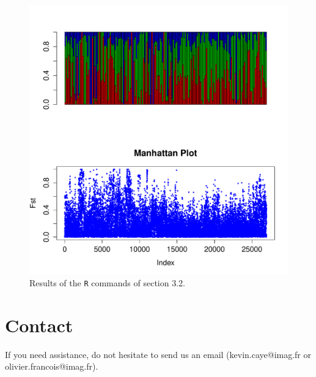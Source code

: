 \documentclass[10pt,a4paper]{article}
\begin{document}
\begin{figure}[h!]\centering
\includegraphics[width=\linewidth]{barplot.pdf}
\caption{Results of the {\tt R} commands of section 3.2.}\label{fig:bar}
\end{figure} 

\section{Contact}
If you need assistance, do not hesitate to send us an email (kevin.caye@imag.fr 
or olivier.francois@imag.fr). 



\end{document}
